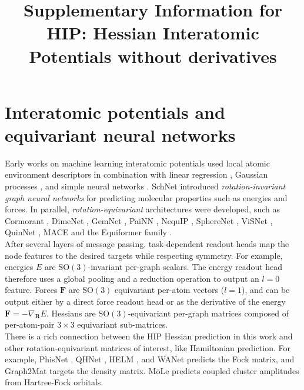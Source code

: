 \documentclass[pdflatex,sn-mathphys-num]{sn-jnl}%
\begin{document}
\title[Supplementary Information]{Supplementary Information for HIP: Hessian Interatomic Potentials without derivatives}

\author[1]{ }
\author[1]{ }
\author[1]{ }
\author[1]{ }
\author[1]{ }
\author[1]{ }
\author[1]{ }
\author*[1]{ }

\maketitle

\section{Interatomic potentials and equivariant neural networks}
Early works on machine learning interatomic potentials used local atomic environment descriptors in combination with linear regression \citep{thompson2015,shapeev2016}, Gaussian processes \citep{bartok2010}, and simple neural networks \citep{behler2007}.
SchNet \citep{schutt2018} introduced \textit{rotation-invariant graph neural networks} for predicting molecular properties such as energies and forces.
In parallel, \textit{rotation-equivariant} architectures were developed, such as Cormorant \citep{anderson2019}, DimeNet \citep{gasteiger2020}, GemNet \citep{gasteiger2021}, PaiNN \citep{schutt2021}, NequIP \citep{batzner2022}, SphereNet \citep{liu2022}, ViSNet \citep{wang2022}, QuinNet \citep{wang2024}, MACE \citep{batatia2022} and the Equiformer family \citep{liao2023, liao2023equiformerv2, burger2025dequify}. \\
After several layers of message passing, task-dependent readout heads map the node features to the desired targets while respecting symmetry. For example, energies $E$ are $\mathrm{SO}(3)$-invariant per-graph scalars. The energy readout head therefore uses a global pooling and a reduction operation to output an $l{=}0$ feature. Forces $\mathbf{F}$ are $\mathrm{SO}(3)$ equivariant per-atom vectors ($l=1$), and can be output either by a direct force readout head or as the derivative of the energy $\mathbf{F} = -\nabla_\mathbf{R} E$. Hessians are $\mathrm{SO}(3)$-equivariant per-graph matrices composed of per-atom-pair $3\times3$ equivariant sub-matrices. \\
There is a rich connection between the HIP Hessian prediction in this work and other rotation-equivariant matrices of interest, like Hamiltonian prediction. For example, PhisNet \cite{unke2021se}, QHNet \cite{yu2023efficient}, HELM \cite{kaniselvan2025helm}, and WANet \cite{li2025enhancing} predicts the Fock matrix, and Graph2Mat \cite{febrer2025graph2mat} targets the density matrix. M\={o}Le \citep{thiede2026mole,burger2026molelambda} predicts coupled cluster amplitudes from Hartree-Fock orbitals.
% 
\end{document}
